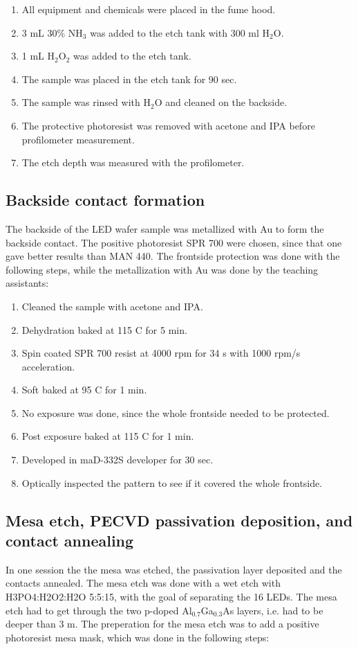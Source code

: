 \begin{enumerate}
    \item All equipment and chemicals were placed in the fume hood.
    \item 3 mL 30\% NH$_3$ was added to the etch tank with 300 ml H$_2$O.
    \item 1 mL H$_2$O$_2$ was added to the etch tank.
    \item The sample was placed in the etch tank for 90 sec.
    \item The sample was rinsed with H$_2$O and cleaned on the backside.
    \item The protective photoresist was removed with acetone and IPA before profilometer measurement.
    \item The etch depth was measured with the profilometer.
\end{enumerate}



\subsection{Backside contact formation}
\label{methods:backside_metallization}
The backside of the LED wafer sample was metallized with Au to form the backside contact.
The positive photoresist SPR 700 were chosen, since that one gave better results than MAN 440.
The frontside protection was done with the following steps, while the metallization with Au was done by the teaching assistants:
\begin{enumerate}
    \item Cleaned the sample with acetone and IPA.
    \item Dehydration baked at 115 \textdegree C for 5 min.
    \item Spin coated SPR 700 resist at 4000 rpm for 34 s with 1000 rpm/s acceleration.
    \item Soft baked at 95 \textdegree C for 1 min.
    \item No exposure was done, since the whole frontside needed to be protected.
    \item Post exposure baked at 115 \textdegree C for 1 min.
    \item Developed in maD-332S developer for 30 sec.
    \item Optically inspected the pattern to see if it covered the whole frontside.
\end{enumerate}


\subsection{Mesa etch, PECVD passivation deposition, and contact annealing}
\label{methods:PECVD}
In one session the the mesa was etched, the passivation layer deposited and the contacts annealed.
The mesa etch was done with a wet etch with H3PO4:H2O2:H2O 5:5:15, with the goal of separating the 16 LEDs.
The mesa etch had to get through the two p-doped Al$_0.7$Ga$_0.3$As layers, i.e. had to be deeper than 3 \textmu m.
The preperation for the mesa etch was to add a positive photoresist mesa mask, which was done in the following steps:


